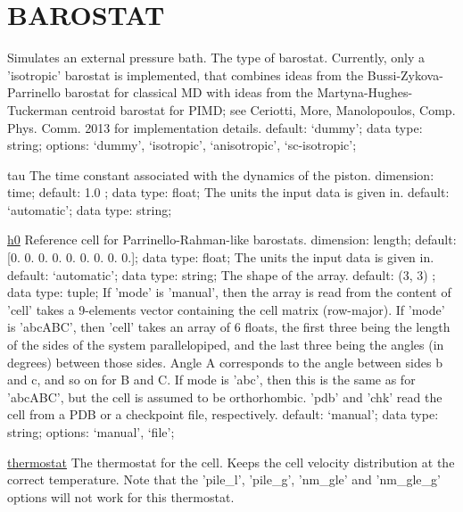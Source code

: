 \section{BAROSTAT}
\label{BAROSTAT}
\begin{ipifield}{}%
{Simulates an external pressure bath.}%
{}%
{%
{The type of barostat.  Currently, only a 'isotropic' barostat is implemented, that combines
                                    ideas from the Bussi-Zykova-Parrinello barostat for classical MD with ideas from the
                                    Martyna-Hughes-Tuckerman centroid barostat for PIMD; see Ceriotti, More, Manolopoulos, Comp. Phys. Comm. 2013 for
                                    implementation details.}%
{default: `dummy'; data type: string; options: `dummy', `isotropic', `anisotropic', `sc-isotropic'; }%
}
\begin{ipifield}{tau}%
{The time constant associated with the dynamics of the piston.}%
{dimension: time; default:  1.0 ; data type: float; }%
{%
{The units the input data is given in.}%
{default: `automatic'; data type: string; }%
}
\end{ipifield}
\begin{ipifield}{\hyperref[CELL]{h0}}%
{Reference cell for Parrinello-Rahman-like barostats.}%
{dimension: length; default: 
      [0. 0. 0. 0. 0. 0. 0. 0. 0.]; data type: float; }%
{%
{The units the input data is given in.}%
{default: `automatic'; data type: string; }%
%
{The shape of the array.}%
{default:  (3, 3) ; data type: tuple; }%
%
{If 'mode' is 'manual', then the array is read from the content of 'cell' takes a 9-elements vector containing the cell matrix (row-major). If 'mode' is 'abcABC', then 'cell' takes an array of 6 floats, the first three being the length of the sides of the system parallelopiped, and the last three being the angles (in degrees) between those sides. Angle A corresponds to the angle between sides b and c, and so on for B and C. If mode is 'abc', then this is the same as for 'abcABC', but the cell is assumed to be orthorhombic. 'pdb' and 'chk' read the cell from a PDB or a checkpoint file, respectively.}%
{default: `manual'; data type: string; options: `manual', `file'; }%
}
\end{ipifield}
\begin{ipifield}{\hyperref[THERMOSTATS]{thermostat}}%
{The thermostat for the cell. Keeps the cell velocity distribution at the correct temperature. Note that the 'pile\_l', 'pile\_g', 'nm\_gle' and 'nm\_gle\_g' options will not work for this thermostat.}%

\end{ipifield}
\end{ipifield}
